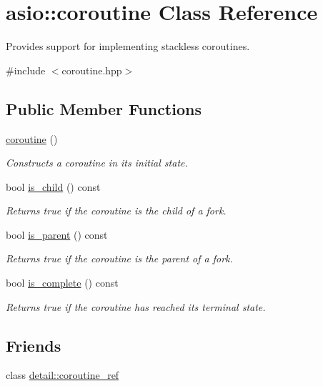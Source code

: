 \hypertarget{classasio_1_1coroutine}{}\section{asio\+:\+:coroutine Class Reference}
\label{classasio_1_1coroutine}


Provides support for implementing stackless coroutines.  




{\ttfamily \#include $<$coroutine.\+hpp$>$}

\subsection*{Public Member Functions}
\begin{DoxyCompactItemize}
\item 
\hyperlink{classasio_1_1coroutine_aae689a0aee08699c9d68bdc9d246b5cb}{coroutine} ()
\begin{DoxyCompactList}\small\item\em Constructs a coroutine in its initial state. \end{DoxyCompactList}\item 
bool \hyperlink{classasio_1_1coroutine_ab7693e381b3fc429bc12393c73f507a3}{is\+\_\+child} () const 
\begin{DoxyCompactList}\small\item\em Returns true if the coroutine is the child of a fork. \end{DoxyCompactList}\item 
bool \hyperlink{classasio_1_1coroutine_ab5ed275eee663bca6638668ff27dd40d}{is\+\_\+parent} () const 
\begin{DoxyCompactList}\small\item\em Returns true if the coroutine is the parent of a fork. \end{DoxyCompactList}\item 
bool \hyperlink{classasio_1_1coroutine_a31134bbc275316e9bea1e08df9021a68}{is\+\_\+complete} () const 
\begin{DoxyCompactList}\small\item\em Returns true if the coroutine has reached its terminal state. \end{DoxyCompactList}\end{DoxyCompactItemize}
\subsection*{Friends}
\begin{DoxyCompactItemize}
\item 
class \hyperlink{classasio_1_1coroutine_a481da3cf2fa1764180915143c632eb2e}{detail\+::coroutine\+\_\+ref}
\end{DoxyCompactItemize}


